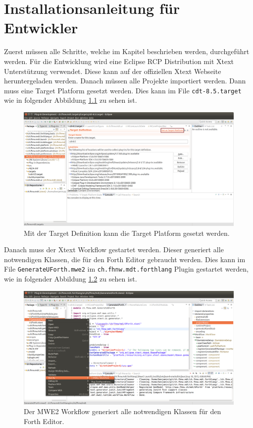 \documentclass[listof=totocnumbered,bibliography=totocnumbered]{scrreprt}
\numberwithin{equation}{subsection}
\begin{document}
\newpage
\chapter{Installationsanleitung für Entwickler}

Zuerst müssen alle Schritte, welche im Kapitel  beschrieben werden, durchgeführt werden. Für die Entwicklung wird eine Eclipse RCP Distribution mit Xtext Unterstützung verwendet. Diese kann auf der offiziellen Xtext Webseite\cite{downloadxtext} heruntergeladen werden. Danach müssen alle Projekte importiert werden. Dann muss eine Target Platform gesetzt werden. Dies kann im File \verb!cdt-8.5.target! wie in folgender Abbildung \ref{fig:selecttarget} zu sehen ist.

\begin{figure}[H]
	\centering
		\includegraphics[scale=0.2]{targetplatform.png}
		\caption{Mit der Target Definition kann die Target Platform gesetzt werden.}
		\label{fig:selecttarget}
\end{figure}

Danach muss der Xtext Workflow gestartet werden. Dieser generiert alle notwendigen Klassen, die für den Forth Editor gebraucht werden. Dies kann im File \verb!GenerateUForth.mwe2! im \verb!ch.fhnw.mdt.forthlang! Plugin gestartet werden, wie in folgender Abbildung \ref{fig:runmwe2} zu sehen ist.

\begin{figure}[H]
	\centering
		\includegraphics[scale=0.2]{runmwe2.png}
		\caption{Der MWE2 Workflow generiert alle notwendigen Klassen für den Forth Editor.}
		\label{fig:runmwe2}
\end{figure}
\end{document}
